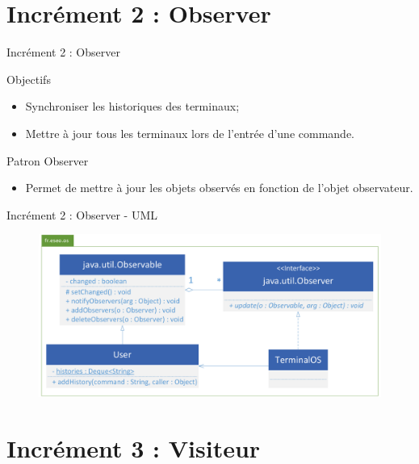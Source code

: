 \documentclass[utf8, 14pt]{beamer}
\begin{document}
\section{Incrément 2 : Observer}
	
	\begin{frame}{Incrément 2 : Observer}
		\begin{block}{Objectifs}
		\begin{itemize}
		\item Synchroniser les historiques des terminaux;
		\item Mettre à jour tous les terminaux lors de l'entrée d'une commande.
		\end{itemize}
		\end{block}
		
		\begin{exampleblock}{Patron Observer}
		\begin{itemize}
		\item Permet de mettre à jour les objets observés en fonction de l'objet observateur.
		\end{itemize}
		\end{exampleblock}					
	\end{frame}

	\begin{frame}{Incrément 2 : Observer - UML}
		\begin{figure}[!h]
		\centering
		\includegraphics[width=\textwidth]{../uml/uml-observer}
		\end{figure}		
	\end{frame}



\section{Incrément 3 : Visiteur}
	
\end{document}
